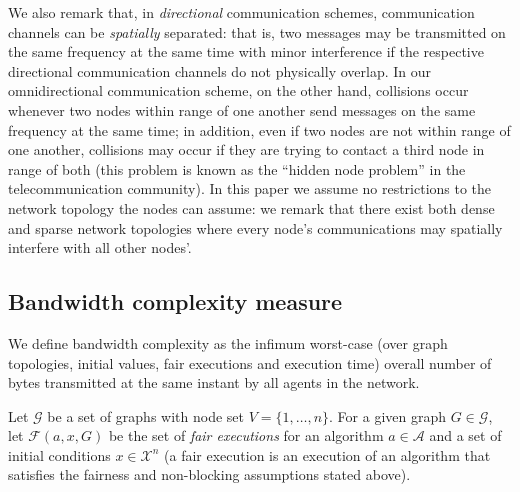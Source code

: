 \documentclass[letterpaper,10pt,conference]{ieeeconf}
\begin{document}
We also remark that, in \emph{directional} communication schemes, communication channels can be \emph{spatially} separated: that is, two messages may be transmitted on the same frequency at the same time with minor interference if the respective directional communication channels do not physically overlap. In our omnidirectional communication scheme, on the other hand, collisions occur whenever two nodes within range of one another send messages on the same frequency at the same time; in addition, even if two nodes are not within range of one another, collisions may occur if they are trying to contact a third node in range of both (this problem is known as the ``hidden node problem'' in the telecommunication community). In this paper we assume no restrictions to the network topology the nodes can assume: we remark that there exist both dense and sparse network topologies where every node's communications may spatially interfere with all other nodes'.

\subsection{Bandwidth complexity measure}
We define bandwidth complexity  as the infimum worst-case (over graph topologies, initial values, fair executions and execution time) overall number of bytes transmitted at the same instant by all agents in the network.

Let $\mathcal G$ be a set of graphs with node set $V=\{1,\ldots, n\}$. For a given graph $G\in \mathcal G$, let $\mathcal F(a, x, G)$ be the set of \emph{fair executions}  for an algorithm  $a\in \mathcal A$ and a set of initial conditions $x \in \mathcal X^{n}$  (a fair execution is an execution of an algorithm that satisfies the fairness and non-blocking assumptions stated above).
\end{document}
